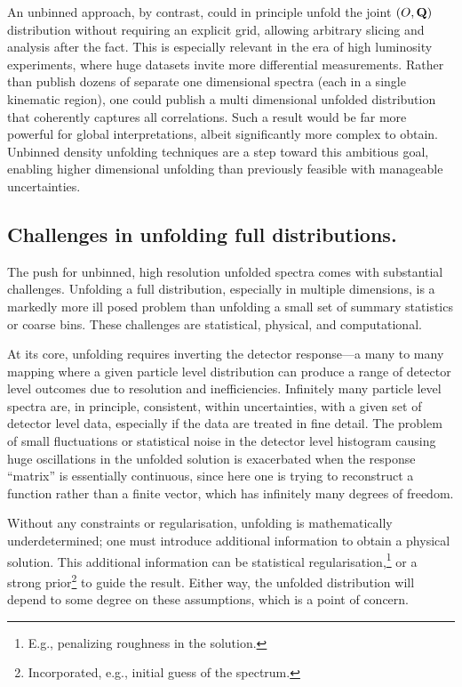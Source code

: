 \begin{description}
            An unbinned approach, by contrast, could in principle unfold the joint $(O,\vb{Q})$ distribution without requiring an explicit grid, allowing arbitrary slicing and analysis after the fact.
            This is especially relevant in the era of high luminosity experiments, where huge datasets invite more differential measurements.
            Rather than publish dozens of separate one dimensional spectra (each in a single kinematic region), one could publish a multi dimensional unfolded distribution that coherently captures all correlations.
            Such a result would be far more powerful for global interpretations, albeit significantly more complex to obtain.
            Unbinned density unfolding techniques are a step toward this ambitious goal, enabling higher dimensional unfolding than previously feasible with manageable uncertainties.
    \end{description}
    \subsection{Challenges in unfolding full distributions.}
        The push for unbinned, high resolution unfolded spectra comes with substantial challenges.
        Unfolding a full distribution, especially in multiple dimensions, is a markedly more ill posed problem than unfolding a small set of summary statistics or coarse bins.
        These challenges are statistical, physical, and computational.

        At its core, unfolding requires inverting the detector response---a many to many mapping where a given particle level distribution can produce a range of detector level outcomes due to resolution and inefficiencies.
        Infinitely many particle level spectra are, in principle, consistent, within uncertainties, with a given set of detector level data, especially if the data are treated in fine detail.
        The problem of small fluctuations or statistical noise in the detector level histogram causing huge oscillations in the unfolded solution is exacerbated when the response ``matrix'' is essentially continuous, since here one is trying to reconstruct a function rather than a finite vector, which has infinitely many degrees of freedom.
        
        Without any constraints or regularisation, unfolding is mathematically underdetermined; one must introduce additional information to obtain a physical solution.
        This additional information can be statistical regularisation,\footnote{E.g., penalizing roughness in the solution.} or a strong prior\footnote{Incorporated, e.g., initial guess of the spectrum.} to guide the result.
        Either way, the unfolded distribution will depend to some degree on these assumptions, which is a point of concern.

